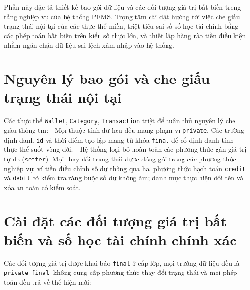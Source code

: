 \documentclass[a4paper,12pt]{report}
\newcommand{\passthrough}[1]{#1}
\begin{document}
Phần này đặc tả thiết kế bao gói dữ liệu và các đối tượng giá trị bất
biến trong tầng nghiệp vụ của hệ thống PFMS. Trọng tâm cài đặt hướng tới
việc che giấu trạng thái nội tại của các thực thể miền, triệt tiêu sai
số số học tài chính bằng các phép toán bất biến trên kiểu số thực lớn,
và thiết lập hàng rào tiền điều kiện nhằm ngăn chặn dữ liệu sai lệch xâm
nhập vào hệ thống.

\section{Nguyên lý bao gói và che giấu trạng thái nội
tại}\label{nguyuxean-luxfd-bao-guxf3i-vuxe0-che-giux1ea5u-trux1ea1ng-thuxe1i-nux1ed9i-tux1ea1i}

Các thực thể \passthrough{\lstinline!Wallet!},
\passthrough{\lstinline!Category!},
\passthrough{\lstinline!Transaction!} triệt để tuân thủ nguyên lý che
giấu thông tin: - Mọi thuộc tính dữ liệu đều mang phạm vi
\passthrough{\lstinline!private!}. Các trường định danh
\passthrough{\lstinline!id!} và thời điểm tạo lập mang từ khóa
\passthrough{\lstinline!final!} để cố định danh tính thực thể suốt vòng
đời. - Hệ thống loại bỏ hoàn toàn các phương thức gán giá trị tự do
(\passthrough{\lstinline!setter!}). Mọi thay đổi trạng thái được đóng
gói trong các phương thức nghiệp vụ: ví tiền điều chỉnh số dư thông qua
hai phương thức hạch toán \passthrough{\lstinline!credit!} và
\passthrough{\lstinline!debit!} có kiểm tra ràng buộc số dư không âm;
danh mục thực hiện đổi tên và xóa an toàn có kiểm soát.

\section{Cài đặt các đối tượng giá trị bất biến và số học tài chính
chính
xác}\label{cuxe0i-ux111ux1eb7t-cuxe1c-ux111ux1ed1i-tux1b0ux1ee3ng-giuxe1-trux1ecb-bux1ea5t-biux1ebfn-vuxe0-sux1ed1-hux1ecdc-tuxe0i-chuxednh-chuxednh-xuxe1c}

Các đối tượng giá trị được khai báo \passthrough{\lstinline!final!} ở
cấp lớp, mọi trường dữ liệu đều là
\passthrough{\lstinline!private final!}, không cung cấp phương thức thay
đổi trạng thái và mọi phép toán đều trả về thể hiện mới:
\end{document}

